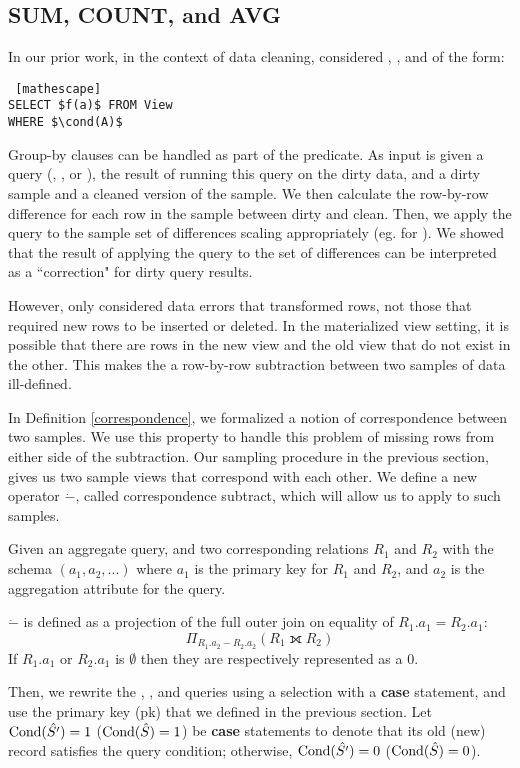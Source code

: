 \subsection{SUM, COUNT, and AVG}
In our prior work, in the context of data cleaning, \nsc considered \sumfunc, \countfunc, and \avgfunc of the form:
\begin{lstlisting} [mathescape]
SELECT $f(a)$ FROM View 
WHERE $\cond(A)$
\end{lstlisting}
Group-by clauses can be handled as part of the predicate.
As input \nsc is given a query (\sumfunc, \countfunc, or \avgfunc), the result of running this query on the dirty data, and a dirty sample and a cleaned version of the sample.
We then calculate the row-by-row difference for each row in the sample between dirty and clean.
Then, we apply the query to the sample set of differences scaling appropriately (eg. for \sumfunc).
We showed that the result of applying the query to the set of differences can be interpreted as a ``correction" for dirty query results.

However, \nsc only considered data errors that transformed rows, not those that required new rows to be inserted or deleted.
In the materialized view setting, it is possible that there are rows in the new view and the old view that do not exist in the other.
This makes the a row-by-row subtraction between two samples of data ill-defined. 

In Definition \ref{correspondence}, we formalized a notion of correspondence between two samples.
We use this property to handle this problem of missing rows from either side of the subtraction.
Our sampling procedure in the previous section, gives us two sample views that correspond with each other.
We define a new operator $\dot{-}$, called correspondence subtract, which will allow us to apply \nsc to such samples.
\begin{definition} Given an aggregate query, and two corresponding relations $R_1$ and $R_2$ with the schema $(a_1, a_2, ...)$ where $a_1$ is the primary key for $R_1$ and $R_2$, and $a_2$ is the aggregation attribute for the query. 

$\dot{-}$ is defined as a projection of the full outer join on equality of $R_1.a_1 = R_2.a_1$: \[ \Pi_{R_1.a_2 - R_2.a_2} ( R_1 \fullouterjoin R_2 ) \]
If $R_1.a_1$ or $R_2.a_1$ is $\emptyset$ then they are respectively represented as a $0$.
\end{definition}

Then, we rewrite the \sumfunc, \countfunc, and \avgfunc queries using a selection with a \textbf{case} statement, and use the primary key (pk) that we defined in the previous section.
Let $\textrm{Cond}(\hat{S'})=1$ ($\textrm{Cond}(\hat{S})=1$) be \textbf{case} statements to denote that its old (new) record satisfies the query condition; otherwise, $\textrm{Cond}(\hat{S'})=0$ ($\textrm{Cond}(\hat{S})=0$). 

